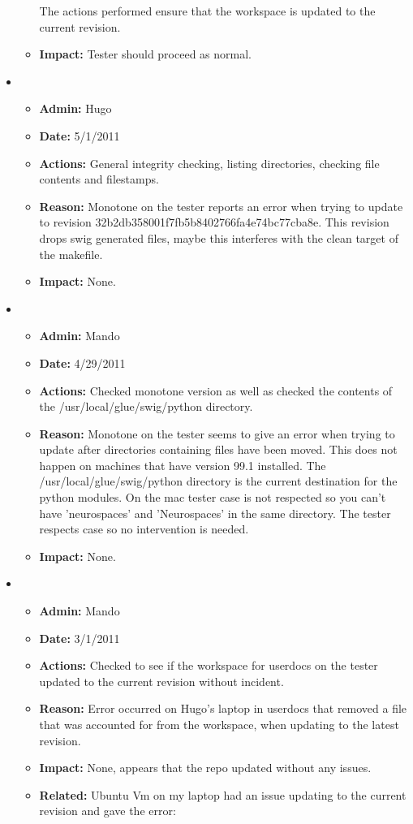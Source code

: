 \documentclass[12pt]{article}
\begin{document}
\begin{itemize}
\begin{itemize}
  The actions performed ensure that the workspace is updated to the
  current revision.
  
  \item[] {\bf Impact:} Tester should proceed as normal. 
  \end{itemize}
  
  
\item
  \begin{itemize}
  \item[] {\bf Admin:} Hugo
  \item[] {\bf Date:} 5/1/2011
  \item[] {\bf Actions:} General integrity checking, listing
    directories, checking file contents and filestamps.
  \item[] {\bf Reason:} Monotone on the tester reports an error when
    trying to update to revision
    32b2db358001f7fb5b8402766fa4e74bc77cba8e.  This revision drops
    swig generated files, maybe this interferes with the clean target
    of the makefile.
  \item[] {\bf Impact:} None.
  \end{itemize}


\item
  \begin{itemize}
  \item[] {\bf Admin:} Mando
  \item[] {\bf Date:} 4/29/2011
  \item[] {\bf Actions:} Checked monotone version as well as checked
    the contents of the /usr/local/glue/swig/python directory.
  \item[] {\bf Reason:} Monotone on the tester seems to give an error
    when trying to update after directories containing files have been
    moved. This does not happen on machines that have version 99.1
    installed. The /usr/local/glue/swig/python directory is the
    current destination for the python modules. On the mac tester case
    is not respected so you can't have 'neurospaces' and 'Neurospaces'
    in the same directory. The tester respects case so no intervention
    is needed.
  \item[] {\bf Impact:} None.
  \end{itemize}


\item
  \begin{itemize}
  \item[] {\bf Admin:} Mando
  \item[] {\bf Date:} 3/1/2011 
  \item[] {\bf Actions:} Checked to see if the workspace for userdocs on the tester updated to the current revision without incident.
  \item[] {\bf Reason:} Error occurred on Hugo's laptop in userdocs that removed a file that was accounted for from the workspace, when
  updating to the latest revision. 
  \item[] {\bf Impact:} None, appears that the repo updated without any issues. 
  \item[] {\bf Related:} Ubuntu Vm on my laptop had an issue updating to the current revision and gave the error:
  

\end{itemize}
\end{itemize}
\end{document}
